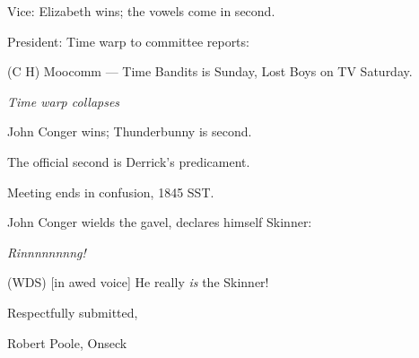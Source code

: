 Vice: Elizabeth wins; the vowels come in second.

President:  Time warp to committee reports:

(C H) Moocomm --- Time Bandits is Sunday, Lost Boys on TV Saturday.

{\em Time warp collapses\/}

John Conger wins; Thunderbunny is second.

The official second is Derrick's predicament.

Meeting ends in confusion, 1845 SST.

John Conger wields the gavel, declares himself Skinner:

{\em Rinnnnnnnng!\/}

(WDS) [in awed voice]  He really {\em is\/} the Skinner!

\vspace{0.15in}
\begin{center}
Respectfully submitted,

Robert Poole, Onseck
\end{center}

